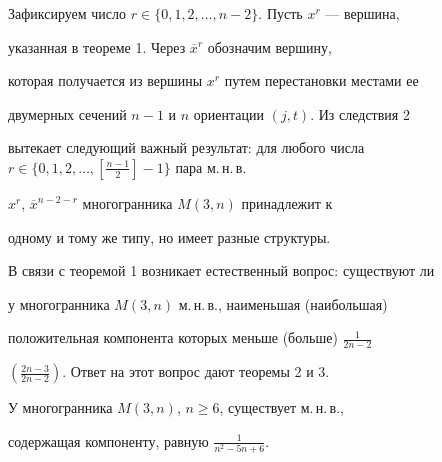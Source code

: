 Зафиксируем число $r\in \{0,1,2,\dotsc,n-2\}$. Пусть $x^r$ --- вершина,


указанная в теореме 1. Через $\overline{x}^r$ обозначим вершину,


которая получается из вершины $x^r$ путем перестановки местами ее


двумерных сечений $n-1$ и $n$ ориентации $(j,t)$. Из следствия 2


вытекает следующий важный результат: для любого числа $r\in


\{0,1,2,\dotsc,\left[\frac{n-1}{2}\right]-1\}$ пара м.\,н.\,в.


$x^r$, $\overline{x}^{n-2-r}$ многогранника $M(3,n)$ принадлежит к


одному и тому же типу, но имеет разные структуры.





В связи с теоремой 1 возникает естественный вопрос: существуют ли


у многогранника $M(3,n)$ м.\,н.\,в., наименьшая (наибольшая)


положительная компонента которых меньше (больше) $\frac{1}{2n-2}$


$(\frac{2n-3}{2n-2})$. Ответ на этот вопрос дают теоремы 2 и 3.





\begin{thm}


У многогранника $M(3,n)$, $n\geq 6$, существует м.\,н.\,в.,


содержащая компоненту, равную $\frac{1}{n^2 -5n+6}$.


\end{thm}





